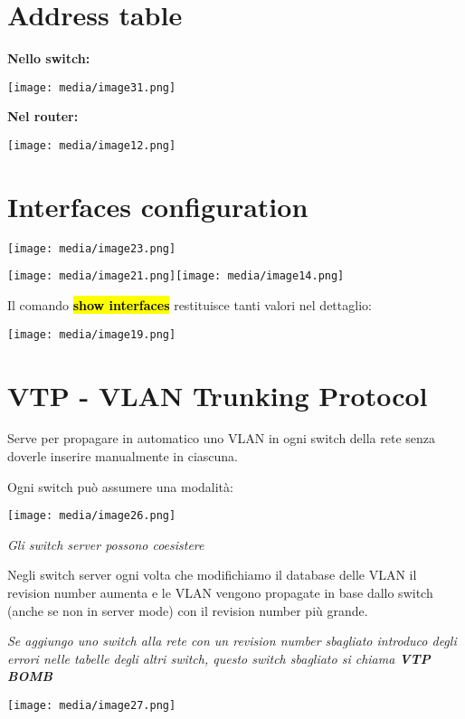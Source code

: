 \section{Address table}\label{address-table}

\textbf{Nello switch:}

\texttt{[image: media/image31.png]}

\textbf{Nel router:}

\texttt{[image: media/image12.png]}

\section{Interfaces configuration}\label{interfaces-configuration}

\texttt{[image: media/image23.png]}

\texttt{[image: media/image21.png]}\texttt{[image: media/image14.png]}

Il comando \textbf{\hl{show interfaces}} restituisce tanti valori nel
dettaglio:

\texttt{[image: media/image19.png]}

\section{VTP - VLAN Trunking
Protocol}\label{vtp---vlan-trunking-protocol}

Serve per propagare in automatico uno VLAN in ogni switch della rete
senza doverle inserire manualmente in ciascuna.

Ogni switch può assumere una modalità:

\texttt{[image: media/image26.png]}

\emph{Gli switch server possono coesistere}

Negli switch server ogni volta che modifichiamo il database delle VLAN
il revision number aumenta e le VLAN vengono propagate in base dallo
switch (anche se non in server mode) con il revision number più grande.

\emph{Se aggiungo uno switch alla rete con un revision number sbagliato
introduco degli errori nelle tabelle degli altri switch, questo switch
sbagliato si chiama \textbf{VTP BOMB}}

\texttt{[image: media/image27.png]}

